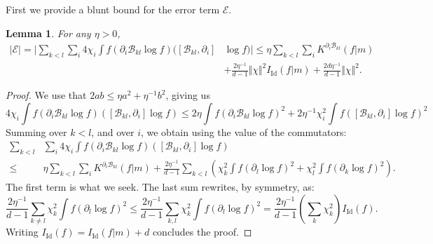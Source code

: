 \documentclass[11pt,a4paper]{article}
\theoremstyle{definition}
\theoremstyle{plain}
\newtheorem{lemma}[defi]{Lemma}
\DeclareMathOperator*{\Id}{Id}
\begin{document}
First we provide a blunt bound for the error term $\mathcal{E}$.
\begin{lemma}
    \label{lem:errorbound}
    For any $\eta>0$,
    \begin{align*}
        \vert \mathcal{E}\vert=\bigg\vert\sum_{k<l} \sum_i 4\chi_i\int f(\partial_i\mathcal{B}_{kl} \log f)([\mathcal{B}_{kl},\partial_i]&\log f) \bigg\vert\leq \eta\sum_{k<l}\sum_i K^{\partial_i\mathcal{B}_{kl} }(f\vert m)\\       
        &+\frac{2\eta^{-1}}{d-1} \Vert \chi \Vert^2 I_{\Id}(f\vert m)+\frac{2d\eta^{-1}}{d-1} \Vert \chi \Vert^2. 
    \end{align*}
\end{lemma}
\begin{proof}
    We use that $2ab\leq \eta a^2 +\eta^{-1}b^2 $, giving us
    $$4\chi_i\int f(\partial_i\mathcal{B}_{kl} \log f)([\mathcal{B}_{kl},\partial_i]\log f) \leq 2\eta\int f(\partial_i\mathcal{B}_{kl} \log f)^2+2\eta^{-1}\chi_i^2\int f([\mathcal{B}_{kl},\partial_i]\log f)^2$$
    Summing over $k<l$, and over $i$, we obtain using the value of the commutators:
    \begin{align*}
        \sum_{k<l} &\sum_i 4\chi_i\int f(\partial_i\mathcal{B}_{kl} \log f)([\mathcal{B}_{kl},\partial_i]\log f)\\ \leq &\eta \sum_{k<l}\sum_i K^{\partial_i\mathcal{B}_{kl} }(f\vert m) +\frac{2\eta^{-1}}{d-1}\sum_{k<l} \left(\chi_k^2\int f(\partial_l\log f)^2+\chi_l^2\int f(\partial_k\log f)^2\right).
    \end{align*}
    The first  term is what we seek. The last sum rewrites, by symmetry, as:
    $$\frac{2\eta^{-1}}{d-1}\sum_{k\neq l} \chi_k^2\int f(\partial_l\log f)^2\leq \frac{2\eta^{-1}}{d-1}\sum_{k, l} \chi_k^2\int f(\partial_l\log f)^2=\frac{2\eta^{-1}}{d-1} \left(\sum_{k} \chi_k^2\right)I_{\Id}(f).$$
    Writing $I_{\Id}(f)=I_{\Id}(f\vert m)+d$ concludes the proof.
\end{proof}
\end{document}
